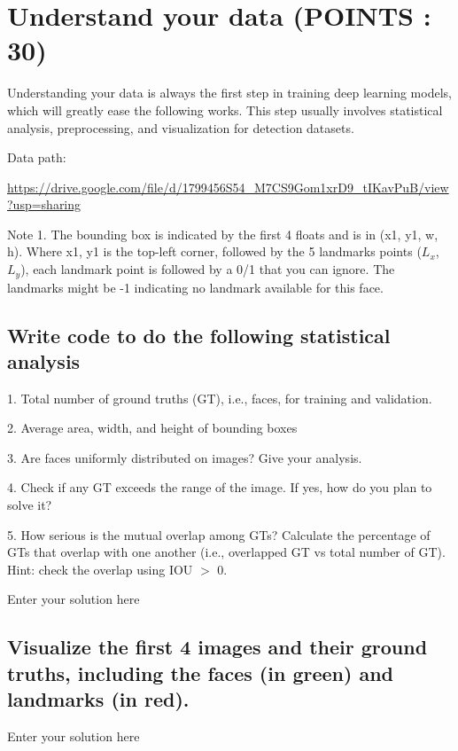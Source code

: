 \documentclass[11pt,addpoints,answers]{exam}
\begin{document}
\section{Understand your data (POINTS : 30)}
Understanding your data is always the first step in training deep learning models, which
will greatly ease the following works. This step usually involves statistical analysis,
preprocessing, and visualization for detection datasets.

Data path: 

\url{https://drive.google.com/file/d/1799456S54_M7CS9Gom1xrD9_tIKavPuB/view?usp=sharing}

Note 1. The bounding box is indicated by the first 4 floats and is in (x1, y1, w, h). Where
x1, y1 is the top-left corner, followed by the 5 landmarks points ($L_x$, $L_y$), each landmark point 
 is followed by a 0/1 that you can ignore. The landmarks
might be -1 indicating no landmark available for this face.


\subsection{Write code to do the following statistical analysis}

1. Total number of ground truths (GT), i.e., faces, for training and validation.


2. Average area, width, and height of bounding boxes


3. Are faces uniformly distributed on images? Give your analysis.


4. Check if any GT exceeds the range of the image. If yes, how do you plan to solve it?


5. How serious is the mutual overlap among GTs? Calculate the percentage of GTs that overlap with one another (i.e., overlapped GT vs total number
of GT). Hint: check the overlap using IOU $>$ 0.

\begin{solution*}{}
Enter your solution here

\end{solution*}

\subsection{Visualize the first 4 images and their ground truths, including the faces (in
green) and landmarks (in red).}


\begin{solution*}{}
Enter your solution here

\end{solution*}
\end{document}
